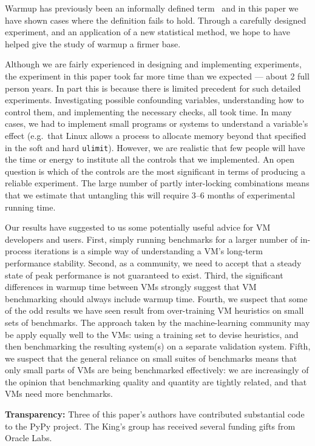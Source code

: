 \documentclass[preprint,numbers,10pt]{sigplanconf}
\begin{document}
Warmup has previously been an informally defined term~\cite{seaton15phd} and in this
paper we have shown cases where the definition fails to hold. Through a carefully
designed experiment, and an application of a new statistical method, we hope
to have helped give the study of warmup a firmer base.

Although we are fairly experienced in designing and implementing
experiments, the experiment in this paper took far more time than we expected
--- about 2 full person years. In part this is because there is limited precedent for such detailed
experiments. Investigating possible confounding variables, understanding how to
control them, and implementing the necessary checks, all took time. In many
cases, we had to implement small programs or systems to understand a variable's
effect (e.g.~that Linux allows a process to allocate memory beyond that
specified in the soft and hard \texttt{ulimit}). However, we are realistic that
few people will have the time or energy to institute all the controls that we
implemented. An open question is which of the controls are the most significant
in terms of producing a reliable experiment. The large number of partly
inter-locking combinations means that we estimate that untangling this will
require 3--6 months of experimental running time.

Our results have suggested to us some potentially useful advice for VM
developers and users. First, simply running benchmarks for a larger number of
in-process iterations is a simple way of understanding a VM's long-term
performance stability. Second, as a community, we need to accept that a steady
state of peak performance is not guaranteed to exist. Third, the significant
differences in warmup time between VMs strongly suggest that VM benchmarking
should always include warmup time. Fourth, we suspect that some of the odd
results we have seen result from over-training VM heuristics on small sets of
benchmarks. The approach taken by the machine-learning community may be apply
equally well to the VMs: using a training set to devise heuristics, and then
benchmarking the resulting system(s) on a separate validation system. Fifth, we suspect
that the general reliance on small suites of benchmarks means that only
small parts of VMs are being benchmarked effectively: we are increasingly of the
opinion that benchmarking quality and quantity are tightly related, and that VMs
need more benchmarks.

\textbf{Transparency:} Three of this paper's authors have contributed
substantial code to the PyPy project. The King's group has received
several funding gifts from Oracle Labs.
\end{document}
